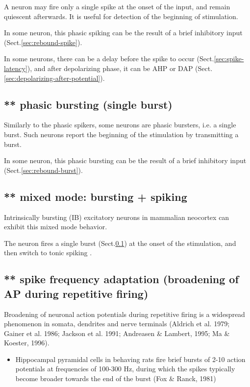 A neuron may fire only a single spike at the onset of the input, and remain
quiescent afterwards. It is useful for detection of the beginning of
stimulation.

In some neuron, this phasic spiking can be the result of a brief inhibitory
input (Sect.\ref{sec:rebound-spike}).

In some neurons, there can be a delay before the spike to occur
(Sect.\ref{sec:spike-latency}), and after depolarizing phase, it can be AHP or
DAP (Sect.\ref{sec:depolarizing-after-potential}).
\subsection{** phasic bursting (single burst)}
\label{sec:phasic-bursting}

Similarly  to  the  phasic  spikers,  some  neurons  are  phasic
bursters, i.e. a single burst. Such neurons report the beginning of
the stimulation by transmitting a burst.

In some neuron, this phasic bursting can be the result of a brief inhibitory
input (Sect.\ref{sec:rebound-burst}).


\subsection{** mixed mode: bursting + spiking}
\label{sec:mixed-mode}

Intrinsically bursting (IB) excitatory neurons in mammalian
neocortex can exhibit this mixed mode behavior.

The neuron fires a single  burst (Sect.\ref{sec:phasic-bursting}) at the
onset of the stimulation, and then switch to tonic spiking
\citep{izhikevich2004}.

\subsection{** spike frequency adaptation (broadening of AP during repetitive
firing)}
\label{sec:tonic-spike-frequency-adapted}


Broadening of neuronal action potentials during repetitive firing is a
widespread phenomenon in somata, dendrites and nerve terminals (Aldrich et al.
1979; Gainer et al. 1986; Jackson et al. 1991; Andreasen \& Lambert, 1995; Ma \&
Koester, 1996).

\begin{itemize}

  \item  Hippocampal pyramidal cells in behaving rats fire brief bursts of 2-10
  action potentials at frequencies of 100-300 Hz, during which the spikes
  typically become broader towards the end of the burst (Fox \& Ranck, 1981)
  
\end{itemize}

